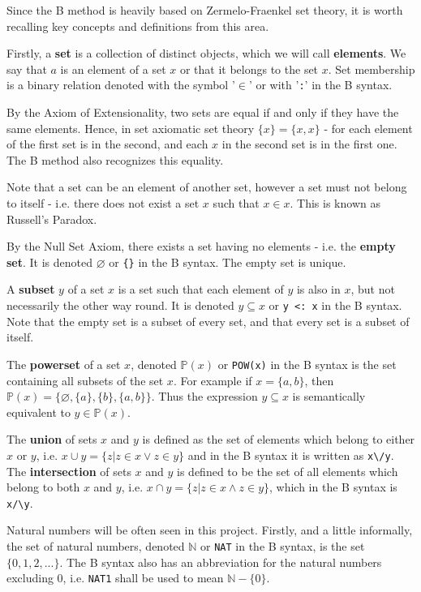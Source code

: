 \documentclass[11pt,journal]{IEEEtran}
\begin{document}
	Since the B method is heavily based on Zermelo-Fraenkel set theory, it is worth recalling key concepts and definitions from this area.\cite{Goldrei}
	
	Firstly, a \textbf{set} is a collection of distinct objects, which we will call \textbf{elements}. We say that $a$ is an element of a set $x$ or that it belongs to the set $x$. Set membership is a binary relation denoted with the symbol '$\in$' or with '\texttt{:}' in the B syntax.
	
	By the Axiom of Extensionality, two sets are equal if and only if they have the same elements. Hence, in set axiomatic set theory $\{x\} = \{x, x\}$ - for each element of the first set is in the second, and each $x$ in the second set is in the first one. The B method also recognizes this equality\cite{b-method}. 
	
	Note that a set can be an element of another set, however a set must not belong to itself - i.e. there does not exist a set $x$ such that $x \in x$. This is known as Russell's Paradox.
	
	By the Null Set Axiom, there exists a set having no elements - i.e. the \textbf{empty set}. It is denoted $\varnothing$ or \texttt{\{\}} in the B syntax. The empty set is unique.
	
	A \textbf{subset} $y$ of a set $x$ is a set such that each element of $y$ is also in $x$, but not necessarily the other way round. It is denoted $y \subseteq x$ or \texttt{y <: x} in the B syntax. Note that the empty set is a subset of every set, and that every set is a subset of itself.
	
	The \textbf{powerset} of a set $x$, denoted $\mathbb{P}(x)$ or \texttt{POW(x)} in the B syntax is the set containing all subsets of the set $x$. For example if $x = \{a,b\}$, then $\mathbb{P}(x) = \{\varnothing, \{a\}, \{b\}, \{a,b\}\}$. Thus the expression $y \subseteq x$ is semantically equivalent to $y \in \mathbb{P}(x)$. 
	
	The \textbf{union} of sets $x$ and $y$ is defined as the set of elements which belong to either $x$ or $y$, i.e. $x \cup y = \{z| z \in x \vee z \in y\}$ and in the B syntax it is written as \verb|x\/y|. The \textbf{intersection} of sets $x$ and $y$ is defined to be the set of all elements which belong to both $x$ and $y$, i.e. $x \cap y = \{z | z \in x \wedge z \in y \}$, which in the B syntax is \verb|x/\y|.

	
	Natural numbers will be often seen in this project. Firstly, and a little informally, the set of natural numbers, denoted $\mathbb{N}$ or \texttt{NAT} in the B syntax, is the set $\{0,1,2, ...\}$. The B syntax also has an abbreviation for the natural numbers excluding 0, i.e. \texttt{NAT1} shall be used to mean $\mathbb{N}-\{0\}$.
	
\end{document}
